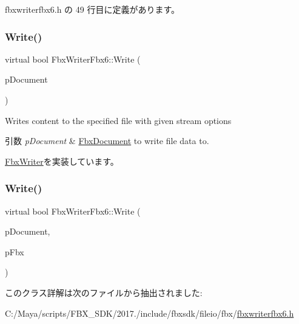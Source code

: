  fbxwriterfbx6.\+h の 49 行目に定義があります。

\mbox{\label{class_fbx_writer_fbx6_a27073868a5a3c4b315e443032916d7d7}} 
\subsubsection{\texorpdfstring{Write()}{Write()}\hspace{0.1cm}{\footnotesize\ttfamily [1/2]}}
{\footnotesize\ttfamily virtual bool Fbx\+Writer\+Fbx6\+::\+Write (\begin{DoxyParamCaption}\item[{\hyperlink{class_fbx_document}{Fbx\+Document} $\ast$}]{p\+Document }\end{DoxyParamCaption})\hspace{0.3cm}{\ttfamily [virtual]}}

Writes content to the specified file with given stream options 
\begin{DoxyParams}{引数}
{\em p\+Document} & \hyperlink{class_fbx_document}{Fbx\+Document} to write file data to. \\
\hline
\end{DoxyParams}


\hyperlink{class_fbx_writer_aa8c0277611da0fdb0b9a184c55c30c2c}{Fbx\+Writer}を実装しています。

\mbox{\label{class_fbx_writer_fbx6_ac5b13eab3a34a36ad1fc63bde58e75bc}} 
\subsubsection{\texorpdfstring{Write()}{Write()}\hspace{0.1cm}{\footnotesize\ttfamily [2/2]}}
{\footnotesize\ttfamily virtual bool Fbx\+Writer\+Fbx6\+::\+Write (\begin{DoxyParamCaption}\item[{\hyperlink{class_fbx_document}{Fbx\+Document} $\ast$}]{p\+Document,  }\item[{\hyperlink{class_fbx_i_o}{Fbx\+IO} $\ast$}]{p\+Fbx }\end{DoxyParamCaption})\hspace{0.3cm}{\ttfamily [virtual]}}



このクラス詳解は次のファイルから抽出されました\+:\begin{DoxyCompactItemize}
\item 
C\+:/\+Maya/scripts/\+F\+B\+X\+\_\+\+S\+D\+K/2017./include/fbxsdk/fileio/fbx/\hyperlink{fbxwriterfbx6_8h}{fbxwriterfbx6.\+h}\end{DoxyCompactItemize}
